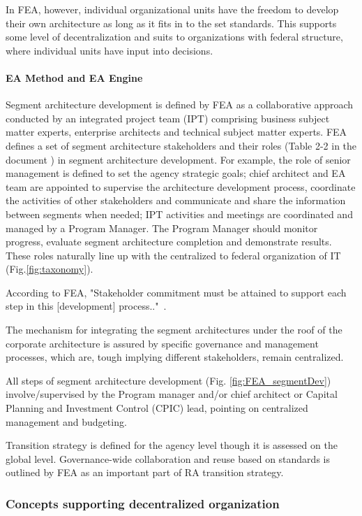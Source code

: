 In FEA, however, individual organizational units have the freedom to develop their own architecture as long as it fits in to the set standards. This supports some level of decentralization and suits to organizations with federal structure, where individual units have input into decisions. 

\paragraph*{EA Method and EA Engine}

Segment architecture development is defined by FEA as a collaborative approach conducted by an integrated project team (IPT) comprising business subject matter experts, enterprise architects and technical subject matter experts.  FEA defines a set of segment architecture stakeholders and their roles (Table 2-2 in the document \cite{FEA_PMO2007}) in segment architecture development.   For example, the role of senior management is defined to set the agency strategic goals; chief architect and EA team are appointed to supervise the architecture development process, coordinate the activities of other stakeholders and communicate and share the information between segments when needed; IPT activities and meetings are coordinated and managed by a Program Manager. The Program Manager should monitor progress, evaluate segment architecture completion and demonstrate results. These roles naturally line up with the centralized to federal organization of IT (Fig.\ref{fig:taxonomy}).

According to FEA, "Stakeholder commitment must be attained to support each step in this [development] process.."~\cite{FEA_PMO2007}.
 
The mechanism for integrating the segment architectures under the roof of the corporate architecture is  assured by specific governance and management processes, which are, tough implying different stakeholders, remain centralized. 

All steps of segment architecture development (Fig. \ref{fig:FEA_segmentDev}) involve/supervised by the Program manager and/or chief architect or Capital Planning and Investment Control (CPIC) lead, pointing on centralized management and budgeting.

Transition strategy is defined for the agency level though it is assessed on the global level. Governance-wide collaboration and reuse based on standards is outlined by FEA as an important part of RA transition strategy.

\subsubsection{Concepts supporting decentralized organization}
